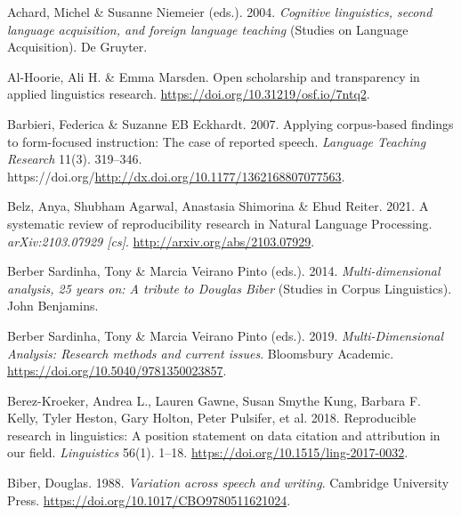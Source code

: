 \documentclass[
  letterpaper,
  DIV=11,
  numbers=noendperiod]{scrreprt}
\newlength{\cslhangindent}
\newenvironment{CSLReferences}[2] %
 {\begin{list}{}{%
  \setlength{\itemindent}{0pt}
  \setlength{\leftmargin}{0pt}
  \setlength{\parsep}{0pt}
  \ifodd #1
   \setlength{\leftmargin}{\cslhangindent}
   \setlength{\itemindent}{-1\cslhangindent}
  \fi
  \setlength{\itemsep}{#2\baselineskip}}}
 {\end{list}}
\begin{document}

\label{refs}
\begin{CSLReferences}{1}{0}
Achard, Michel \& Susanne Niemeier (eds.). 2004. \emph{Cognitive
linguistics, second language acquisition, and foreign language teaching}
(Studies on Language Acquisition). De Gruyter.

Al-Hoorie, Ali H. \& Emma Marsden. Open scholarship and transparency in
applied linguistics research.
\url{https://doi.org/10.31219/osf.io/7ntq2}.

Barbieri, Federica \& Suzanne EB Eckhardt. 2007. Applying corpus-based
findings to form-focused instruction: The case of reported speech.
\emph{Language Teaching Research} 11(3). 319--346.
https://doi.org/\url{http://dx.doi.org/10.1177/1362168807077563}.

Belz, Anya, Shubham Agarwal, Anastasia Shimorina \& Ehud Reiter. 2021. A
systematic review of reproducibility research in {Natural} {Language}
{Processing}. \emph{arXiv:2103.07929 {[}cs{]}}.
\url{http://arxiv.org/abs/2103.07929}.

Berber Sardinha, Tony \& Marcia Veirano Pinto (eds.). 2014.
\emph{Multi-dimensional analysis, 25 years on: A tribute to {Douglas}
{Biber}} (Studies in Corpus Linguistics). John Benjamins.

Berber Sardinha, Tony \& Marcia Veirano Pinto (eds.). 2019.
\emph{Multi-{Dimensional} {Analysis}: Research methods and current
issues}. Bloomsbury Academic.
\url{https://doi.org/10.5040/9781350023857}.

Berez-Kroeker, Andrea L., Lauren Gawne, Susan Smythe Kung, Barbara F.
Kelly, Tyler Heston, Gary Holton, Peter Pulsifer, et al. 2018.
Reproducible research in linguistics: A position statement on data
citation and attribution in our field. \emph{Linguistics} 56(1). 1--18.
\url{https://doi.org/10.1515/ling-2017-0032}.

Biber, Douglas. 1988. \emph{Variation across speech and writing}.
Cambridge University Press.
\url{https://doi.org/10.1017/CBO9780511621024}.


\end{CSLReferences}
\end{document}
